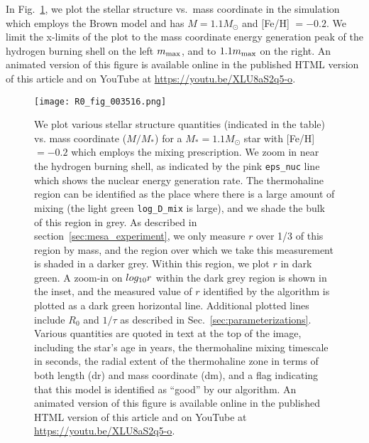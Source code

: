 In Fig.~\ref{Fig:movie}, we plot the stellar structure vs.~mass coordinate in the simulation which employs the Brown model and has $M = 1.1M_\odot$ and [Fe/H] $= -0.2$.
We limit the x-limits of the plot to the mass coordinate energy generation peak of the hydrogen burning shell on the left $m_{\rm max}$, and to $1.1 m_{\rm max}$ on the right.
An animated version of this figure is available online in the published HTML version of this article and on YouTube at \url{https://youtu.be/XLU8aS2q5-o}.

\begin{figure}[!tb]
\begin{center}
\texttt{[image: R0\_fig\_003516.png]}
\caption{
    We plot various stellar structure quantities (indicated in the table) vs. mass coordinate ($M / M_*$) for a $M_* = 1.1 M_\odot$ star with [Fe/H] $= -0.2$ which employs the \citet{brown_etal_2013} mixing prescription.
    We zoom in near the hydrogen burning shell, as indicated by the pink \texttt{eps\_nuc} line which shows the nuclear energy generation rate.
    The thermohaline region can be identified as the place where there is a large amount of mixing (the light green \texttt{log\_D\_mix} is large), and we shade the bulk of this region in grey.
    As described in section~\ref{sec:mesa_experiment}, we only measure $r$ over 1/3 of this region by mass, and the region over which we take this measurement is shaded in a darker grey.
    Within this region, we plot $r$ in dark green.
    A zoom-in on $log_{\rm{10}}r$ within the dark grey region is shown in the inset, and the measured value of $r$ identified by the algorithm is plotted as a dark green horizontal line.
    Additional plotted lines include $R_0$ and $1/\tau$ as described in Sec.~\ref{sec:parameterizations}.
    Various quantities are quoted in text at the top of the image, including the star's age in years, the thermohaline mixing timescale in seconds, the radial extent of the thermohaline zone in terms of both length (dr) and mass coordinate (dm), and a flag indicating that this model is identified as ``good'' by our algorithm.
    An animated version of this figure is available online in the published HTML version of this article and on YouTube at \url{https://youtu.be/XLU8aS2q5-o}.
    }
\label{Fig:movie}
\end{center}
\end{figure}